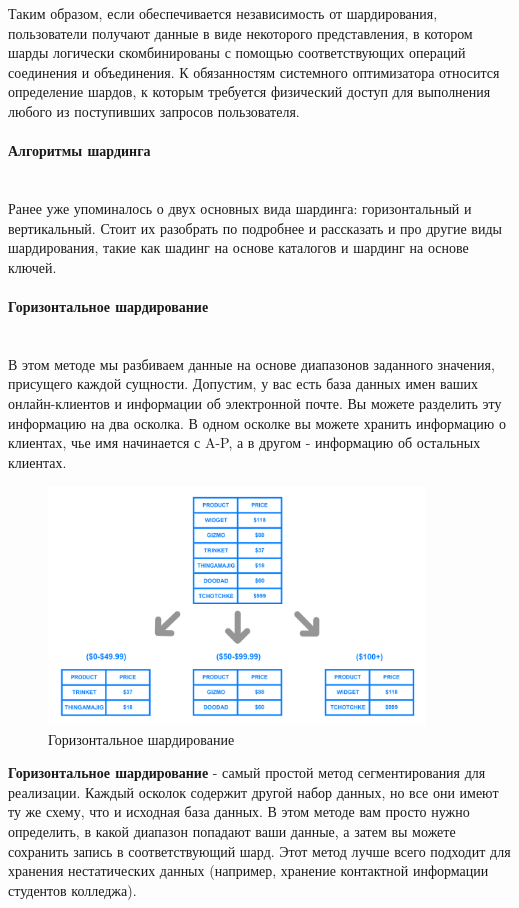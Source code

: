 Таким образом, если обеспечивается независимость от шардирования, пользователи получают данные в виде некоторого
представления, в котором шарды логически скомбинированы с помощью соответствующих операций соединения и объединения.
К обязанностям системного оптимизатора относится определение шардов, к которым требуется физический доступ для
выполнения любого из поступивших запросов пользователя. \autocite{IntroBD2014}

\paragraph{Алгоритмы шардинга} ~\\
Ранее уже упоминалось о двух основных вида шардинга: горизонтальный и вертикальный. Стоит их разобрать по подробнее и
рассказать и про другие виды шардирования, такие как шадинг на основе каталогов и шардинг на основе ключей.

\paragraph{Горизонтальное шардирование} ~\\
В этом методе мы разбиваем данные на основе диапазонов заданного значения, присущего каждой сущности. Допустим, у вас
есть база данных имен ваших онлайн-клиентов и информации об электронной почте. Вы можете разделить эту информацию на
два осколка. В одном осколке вы можете хранить информацию о клиентах, чье имя начинается с A-P, а в другом - информацию
об остальных клиентах.

\begin{figure}[H]
    \centering
    \includegraphics[width=100mm]{assets/distributed/Horizontal-Sharding}
    \caption{Горизонтальное шардирование}
    \label{fig:Horizontal-Sharding}
\end{figure}

\textbf{Горизонтальное шардирование} - самый простой метод сегментирования для реализации. Каждый осколок содержит
другой набор данных, но все они имеют ту же схему, что и исходная база данных. В этом методе вам просто нужно
определить, в какой диапазон попадают ваши данные, а затем вы можете сохранить запись в соответствующий шард. Этот
метод лучше всего подходит для хранения нестатических данных (например, хранение контактной информации студентов
колледжа).

